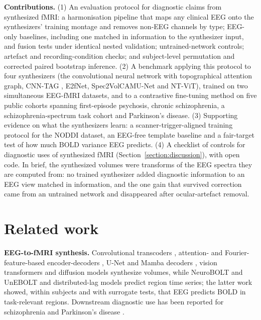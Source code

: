 \documentclass[pdflatex,referee,sn-basic]{sn-jnl}%
\begin{document}
\textbf{Contributions.} (1) An evaluation protocol for diagnostic claims from synthesized fMRI: a harmonisation pipeline that maps any clinical EEG onto the synthesizers' training montage and removes non-EEG channels by type; EEG-only baselines, including one matched in information to the synthesizer input, and fusion tests under identical nested validation; untrained-network controls; artefact and recording-condition checks; and subject-level permutation and corrected paired bootstrap inference. (2) A benchmark applying this protocol to four synthesizers (the convolutional neural network with topographical attention graph, CNN-TAG \cite{calhas2022eeg}, E2fNet, Spec2VolCAMU-Net and NT-ViT), trained on two simultaneous EEG-fMRI datasets, and to a contrastive fine-tuning method \cite{calhas2023medrxiv} on five public cohorts spanning first-episode psychosis, chronic schizophrenia, a schizophrenia-spectrum task cohort and Parkinson's disease. (3) Supporting evidence on what the synthesizers learn: a scanner-trigger-aligned training protocol for the NODDI dataset, an EEG-free template baseline and a fair-target test of how much BOLD variance EEG predicts. (4) A checklist of controls for diagnostic uses of synthesized fMRI (Section~\ref{section:discussion}), with open code. In brief, the synthesized volumes were transforms of the EEG spectra they are computed from: no trained synthesizer added diagnostic information to an EEG view matched in information, and the one gain that survived correction came from an untrained network and disappeared after ocular-artefact removal.

\section{Related work}\label{section:related_work}

\noindent\textbf{EEG-to-fMRI synthesis.} Convolutional transcoders \cite{liu2019convolutional, liu2020latent}, attention- and Fourier-feature-based encoder-decoders \cite{calhas2022eeg}, U-Net and Mamba decoders \cite{roos2025brainwaves,he2025spec2vol}, vision transformers \cite{lanzino2024ntvit} and diffusion models \cite{yao2025catd} synthesize volumes, while NeuroBOLT and UnEBOLT \cite{li2024neurobolt,li2026unebolt} and distributed-lag models \cite{mehta2025time} predict region time series; the latter work showed, within subjects and with surrogate tests, that EEG predicts BOLD in task-relevant regions. Downstream diagnostic use has been reported for schizophrenia \cite{calhas2023medrxiv} and Parkinson's disease \cite{yao2025catd}.
\end{document}
